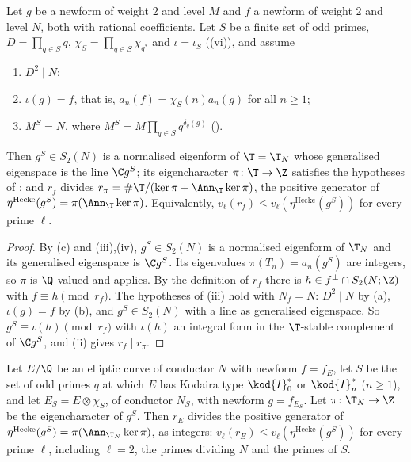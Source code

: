 \begin{theorem}\label{thm:hecke:rE-divides}
Let $g$ be a newform of weight $2$ and level $M$ and $f$ a newform of weight $2$ and level $N$, both with rational coefficients. Let $S$ be a finite set of odd primes, $D=\prod_{q\in S}q$,
$\chi_S=\prod_{q\in S}\chi_{q^*}$ and $\iota=\iota_S$ ((vi)), and assume
\begin{enumerate}[label=(\alph*)]
\item $D^2\mid N$;
\item $\iota(g)=f$, that is, $a_n(f)=\chi_S(n)a_n(g)$ for all $n\ge1$;
\item $M^S=N$, where $M^S=M\prod_{q\in S}q^{\delta_q(g)}$ ().
\end{enumerate}
Then $g^S\in S_2(N)$ is a normalised eigenform of $\T=\T_N$ whose generalised eigenspace is the line $\C g^S$; its eigencharacter $\pi\colon\T\to\Z$ satisfies the hypotheses of
; and $r_f$ divides $r_\pi=\#\T/(\ker\pi+\Ann_\T\ker\pi)$, the positive generator of $\eta^{\mathrm{Hecke}}(g^S)=\pi(\Ann_\T\ker\pi)$. Equivalently,
$v_\ell(r_f)\le v_\ell(\eta^{\mathrm{Hecke}}(g^S))$ for every prime $\ell$.
\end{theorem}

\begin{proof}
By (c) and (iii),(iv), $g^S\in S_2(N)$ is a normalised eigenform of $\T_N$ and its generalised eigenspace is $\C g^S$. Its eigenvalues $\pi(T_n)=a_n(g^S)$ are
integers, so $\pi$ is $\Q$-valued and  applies. By the definition of $r_f$ there is $h\in f^\perp\cap S_2(N;\Z)$ with $f\equiv h\pmod{r_f}$. The hypotheses of
(iii) hold with $N_f=N$: $D^2\mid N$ by (a), $\iota(g)=f$ by (b), and $g^S\in S_2(N)$ with a line as generalised eigenspace. So $g^S\equiv\iota(h)\pmod{r_f}$
with $\iota(h)$ an integral form in the $\T$-stable complement of $\C g^S$, and (ii) gives $r_f\mid r_\pi$.
\end{proof}

\begin{corollary}\label{cor:hecke:rE-divides}
Let $E/\Q$ be an elliptic curve of conductor $N$ with newform $f=f_E$, let $S$ be the set of odd primes $q$ at which $E$ has Kodaira type $\kod{I}_0^*$ or $\kod{I}_n^*$ ($n\ge1$), and let
$E_S=E\otimes\chi_S$, of conductor $N_S$, with newform $g=f_{E_S}$. Let $\pi\colon\T_N\to\Z$ be the eigencharacter of $g^S$. Then $r_E$ divides the positive generator of
$\eta^{\mathrm{Hecke}}(g^S)=\pi(\Ann_{\T_N}\ker\pi)$, as integers: $v_\ell(r_E)\le v_\ell(\eta^{\mathrm{Hecke}}(g^S))$ for every prime $\ell$, including $\ell=2$, the primes dividing $N$ and the
primes of $S$.
\end{corollary}

